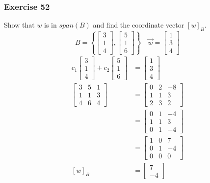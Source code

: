 \documentclass{math}
\begin{document}
\subsubsection*{Exercise 52}
Show that \( w \) is in \( span(B) \) and find the coordinate vector
\( [w]_B \).
\[ B = \left\{\begin{bmatrix}3 \\ 1 \\ 4\end{bmatrix},
  \begin{bmatrix}5 \\ 1 \\ 6\end{bmatrix}\right\} \quad
  \vec{w} = \begin{bmatrix}1 \\ 3 \\ 4\end{bmatrix} \]
\begin{align*}
  c_1\begin{bmatrix}3 \\ 1 \\ 4\end{bmatrix}+
    c_2\begin{bmatrix}5 \\ 1 \\ 6\end{bmatrix} &=
    \begin{bmatrix}1 \\ 3 \\ 4\end{bmatrix} \\
  \begin{bmatrix}
    3 & 5 & 1 \\
    1 & 1 & 3 \\
    4 & 6 & 4
  \end{bmatrix} &= \begin{bmatrix}
    0 & 2 & -8 \\
    1 & 1 & 3 \\
    2 & 3 & 2
  \end{bmatrix} \\
  &= \begin{bmatrix}
    0 & 1 & -4 \\
    1 & 1 & 3 \\
    0 & 1 & -4
  \end{bmatrix} \\
  &= \begin{bmatrix}
    1 & 0 & 7 \\
    0 & 1 & -4 \\
    0 & 0 & 0
  \end{bmatrix} \\
  [w]_B &= \begin{bmatrix}7 \\ -4\end{bmatrix}
\end{align*}
\end{document}
